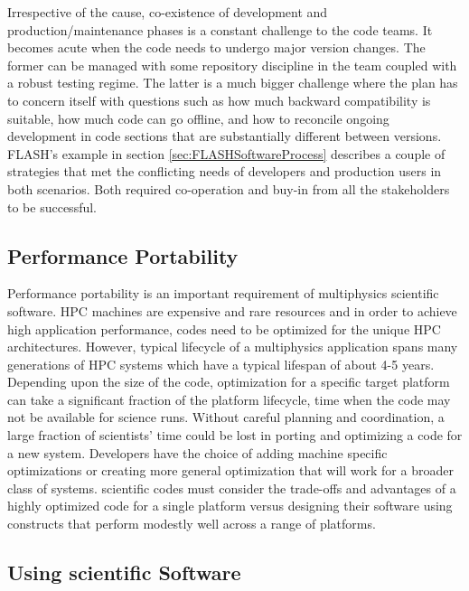 Irrespective of the cause, co-existence of development and
production/maintenance phases is a constant challenge to the code
teams. It becomes acute when the code needs to undergo major version
changes. The former can be managed with some repository
discipline in the team coupled with a robust testing regime. The latter
is a much bigger challenge where the plan has to concern itself with
questions such as how much backward compatibility is suitable, how
much code can go offline, and how to reconcile ongoing development in
code sections that are substantially different between versions.
FLASH's example in section \ref{sec:FLASHSoftwareProcess} describes
a couple of strategies that met the conflicting needs of developers and
production users in both scenarios. Both required co-operation and
buy-in from all the stakeholders to be successful. 


\subsection{Performance Portability}
\label{sec:perfport}

Performance portability is an important requirement of multiphysics
scientific software. HPC machines are expensive and rare resources and in
order to achieve high application performance, codes need to be
optimized for the unique HPC architectures. However, typical lifecycle of a
multiphysics application spans many generations of HPC systems which have a typical lifespan of about 4-5 years.  Depending upon the size of the
code, optimization for a specific target platform can take a
significant fraction of the platform lifecycle, time when the code may not be available for science runs.  Without careful planning and coordination,  a
large fraction of scientists' time could be lost in porting and optimizing
a code for a new system.  Developers have the choice of adding machine
specific optimizations or creating more general optimization that will
work for a broader class of systems.  scientific codes must consider the
trade-offs and advantages of a highly optimized code for a single
platform versus designing their software using constructs that perform
modestly well across a range of platforms. 



\subsection{Using scientific Software}

